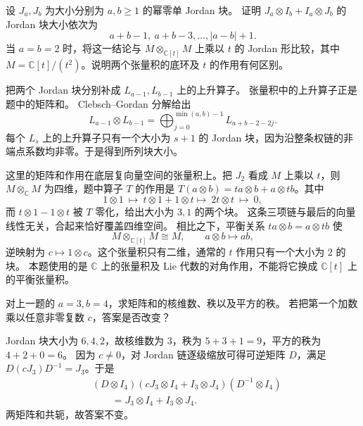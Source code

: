 \begin{exercise}\label{b5:ex:14-jordan-tensor-sum}
	设 \(J_a,J_b\) 为大小分别为 \(a,b\geq1\) 的幂零单 Jordan 块。 证明 \(J_a\otimes I_b+I_a\otimes J_b\) 的 Jordan 块大小依次为
	\[
		a+b-1,\ a+b-3,\ldots,\lvert a-b\rvert+1.
	\]
	当 \(a=b=2\) 时，将这一结论与 \(M\otimes_{\mathbb C[t]}M\) 上乘以 \(t\) 的 Jordan 形比较，其中 \(M=\mathbb C[t]/(t^2)\)。说明两个张量积的底环及 \(t\) 的作用有何区别。
\end{exercise}
\begin{solution}
	把两个 Jordan 块分别补成 \(L_{a-1},L_{b-1}\) 上的上升算子。 张量积中的上升算子正是题中的矩阵和。 Clebsch--Gordan 分解给出
	\[
		L_{a-1}\otimes L_{b-1} =\bigoplus_{j=0}^{\min(a,b)-1}L_{a+b-2-2j}.
	\]
	每个 \(L_s\) 上的上升算子只有一个大小为 \(s+1\) 的 Jordan 块，因为沿整条权链的非端点系数均非零。于是得到所列块大小。

	这里的矩阵和作用在底层复向量空间的张量积上。把 \(J_2\) 看成 \(M\) 上乘以 \(t\)，则 \(M\otimes_{\mathbb C}M\) 为四维，题中算子 \(T\) 的作用是 \(T(a\otimes b)=ta\otimes b+a\otimes tb\)。其中
	\[
		1\otimes1\ \longmapsto\ t\otimes1+1\otimes t \longmapsto\ 2t\otimes t\ \longmapsto\ 0,
	\]
	而 \(t\otimes1-1\otimes t\) 被 \(T\) 零化，给出大小为 \(3,1\) 的两个块。 这条三项链与最后的向量线性无关，合起来恰好覆盖四维空间。 相比之下，平衡关系 \(ta\otimes b=a\otimes tb\) 使
	\[
		M\otimes_{\mathbb C[t]}M\cong M,\qquad a\otimes b\longmapsto ab,
	\]
	逆映射为 \(c\mapsto1\otimes c\)。这个张量积只有二维，通常的 \(t\) 作用只有一个大小为 \(2\) 的块。 本题使用的是 \(\mathbb C\) 上的张量积及 Lie 代数的对角作用，不能将它换成 \(\mathbb C[t]\) 上的平衡张量积。
\end{solution}

\begin{exercise}\label{b5:ex:14-jordan-ranks}
	对上一题的 \(a=3,b=4\)，求矩阵和的核维数、秩以及平方的秩。 若把第一个加数乘以任意非零复数 \(c\)，答案是否改变？
\end{exercise}
\begin{solution}
	Jordan 块大小为 \(6,4,2\)，故核维数为 \(3\)，秩为 \(5+3+1=9\)，平方的秩为 \(4+2+0=6\)。 因为 \(c\ne0\)，对 Jordan 链逐级缩放可得可逆矩阵 \(D\)，满足 \(D(cJ_3)D^{-1}=J_3\)。于是
	\[
		\begin{aligned}
			&(D\otimes I_4)(cJ_3\otimes I_4+I_3\otimes J_4)(D^{-1}\otimes I_4)\\
			&\qquad=J_3\otimes I_4+I_3\otimes J_4.
		\end{aligned}
	\]
	两矩阵和共轭，故答案不变。
\end{solution}

